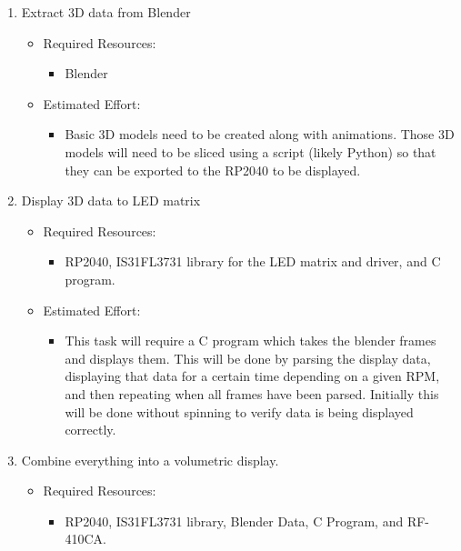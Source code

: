 \documentclass[11pt,journal]{IEEEtran}
\begin{document}
\begin{enumerate}
\begin{itemize}
\begin{itemize}
        \end{itemize}
    \end{itemize}
    \item Extract 3D data from Blender
    \begin{itemize}
        \item Required Resources:
        \begin{itemize}
            \item Blender
        \end{itemize}
        \item Estimated Effort:
        \begin{itemize}
            \item Basic 3D models need to be created along with animations. Those 3D models will need to be sliced using a script (likely Python) so that they can be exported to the RP2040 to be displayed.
        \end{itemize}
    \end{itemize}
    \item Display 3D data to LED matrix
    \begin{itemize}
        \item Required Resources:
        \begin{itemize}
            \item RP2040, IS31FL3731 library for the LED matrix and driver, and C program.
        \end{itemize}
        \item Estimated Effort:
        \begin{itemize}
            \item This task will require a C program which takes the blender frames and displays them. This will be done by parsing the display data, displaying that data for a certain time depending on a given RPM, and then repeating when all frames have been parsed. Initially this will be done without spinning to verify data is being displayed correctly.
        \end{itemize}
    \end{itemize}
    \item Combine everything into a volumetric display.
    \begin{itemize}
        \item Required Resources:
        \begin{itemize}
            \item RP2040, IS31FL3731 library, Blender Data, C Program, and RF-410CA.
        \end{itemize}

\end{itemize}
\end{enumerate}
\end{document}
